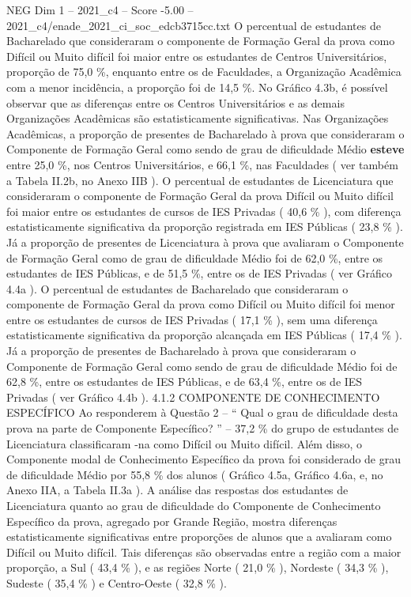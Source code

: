 \begin{textsample}{NEG Dim 1 – 2021\_c4 – Score -5.00 – 2021\_c4/enade\_2021\_ci\_soc\_edcb3715cc.txt}
O percentual de estudantes de Bacharelado que consideraram o componente de Formação Geral da prova como Difícil ou Muito difícil foi maior entre os estudantes de Centros Universitários, proporção de 75,0 \%, enquanto entre os de Faculdades, a Organização Acadêmica com a menor incidência, a proporção foi de 14,5 \%.
No Gráfico 4.3b, é possível observar que as diferenças entre os Centros Universitários e as demais Organizações Acadêmicas são estatisticamente significativas.
Nas Organizações Acadêmicas, a proporção de presentes de Bacharelado à prova que consideraram o Componente de Formação Geral como sendo de grau de dificuldade Médio \textbf{esteve} entre 25,0 \%, nos Centros Universitários, e 66,1 \%, nas Faculdades ( ver também a Tabela II.2b, no Anexo IIB ).
O percentual de estudantes de Licenciatura que consideraram o componente de Formação Geral da prova Difícil ou Muito difícil foi maior entre os estudantes de cursos de IES Privadas ( 40,6 \% ), com diferença estatisticamente significativa da proporção registrada em IES Públicas ( 23,8 \% ).
Já a proporção de presentes de Licenciatura à prova que avaliaram o Componente de Formação Geral como de grau de dificuldade Médio foi de 62,0 \%, entre os estudantes de IES Públicas, e de 51,5 \%, entre os de IES Privadas ( ver Gráfico 4.4a ).
O percentual de estudantes de Bacharelado que consideraram o componente de Formação Geral da prova como Difícil ou Muito difícil foi menor entre os estudantes de cursos de IES Privadas ( 17,1 \% ), sem uma diferença estatisticamente significativa da proporção alcançada em IES Públicas ( 17,4 \% ).
Já a proporção de presentes de Bacharelado à prova que consideraram o Componente de Formação Geral como sendo de grau de dificuldade Médio foi de 62,8 \%, entre os estudantes de IES Públicas, e de 63,4 \%, entre os de IES Privadas ( ver Gráfico 4.4b ). 4.1.2 COMPONENTE DE CONHECIMENTO ESPECÍFICO Ao responderem à Questão 2 – “ Qual o grau de dificuldade desta prova na parte de Componente Específico? ” – 37,2 \% do grupo de estudantes de Licenciatura classificaram -na como Difícil ou Muito difícil.
Além disso, o Componente modal de Conhecimento Específico da prova foi considerado de grau de dificuldade Médio por 55,8 \% dos alunos ( Gráfico 4.5a, Gráfico 4.6a, e, no Anexo IIA, a Tabela II.3a ).
A análise das respostas dos estudantes de Licenciatura quanto ao grau de dificuldade do Componente de Conhecimento Específico da prova, agregado por Grande Região, mostra diferenças estatisticamente significativas entre proporções de alunos que a avaliaram como Difícil ou Muito difícil.
Tais diferenças são observadas entre a região com a maior proporção, a Sul ( 43,4 \% ), e as regiões Norte ( 21,0 \% ), Nordeste ( 34,3 \% ), Sudeste ( 35,4 \% ) e Centro-Oeste ( 32,8 \% ).

\end{textsample}
